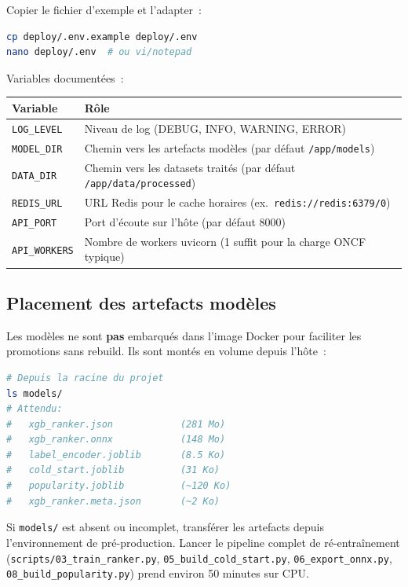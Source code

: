 \documentclass[11pt, a4paper]{article}
\begin{document}
Copier le fichier d'exemple et l'adapter~:

\begin{lstlisting}[language=bash]
cp deploy/.env.example deploy/.env
nano deploy/.env  # ou vi/notepad
\end{lstlisting}

Variables documentées~:

\begin{tabularx}{\linewidth}{@{}lX@{}}
\toprule
\textbf{Variable} & \textbf{Rôle} \\
\midrule
\texttt{LOG\_LEVEL} & Niveau de log (DEBUG, INFO, WARNING, ERROR) \\
\texttt{MODEL\_DIR} & Chemin vers les artefacts modèles (par défaut \texttt{/app/models}) \\
\texttt{DATA\_DIR} & Chemin vers les datasets traités (par défaut \texttt{/app/data/processed}) \\
\texttt{REDIS\_URL} & URL Redis pour le cache horaires (ex.\ \texttt{redis://redis:6379/0}) \\
\texttt{API\_PORT} & Port d'écoute sur l'hôte (par défaut 8000) \\
\texttt{API\_WORKERS} & Nombre de workers uvicorn (1 suffit pour la charge ONCF typique) \\
\bottomrule
\end{tabularx}

\subsection{Placement des artefacts modèles}

Les modèles ne sont \textbf{pas} embarqués dans l'image Docker pour
faciliter les promotions sans rebuild. Ils sont montés en volume depuis
l'hôte~:

\begin{lstlisting}[language=bash]
# Depuis la racine du projet
ls models/
# Attendu:
#   xgb_ranker.json            (281 Mo)
#   xgb_ranker.onnx            (148 Mo)
#   label_encoder.joblib       (8.5 Ko)
#   cold_start.joblib          (31 Ko)
#   popularity.joblib          (~120 Ko)
#   xgb_ranker.meta.json       (~2 Ko)
\end{lstlisting}

Si \texttt{models/} est absent ou incomplet, transférer les artefacts
depuis l'environnement de pré-production. Lancer le pipeline complet de
ré-entraînement (\texttt{scripts/03\_train\_ranker.py},
\texttt{05\_build\_cold\_start.py}, \texttt{06\_export\_onnx.py},
\texttt{08\_build\_popularity.py}) prend environ 50 minutes sur CPU.
\end{document}
